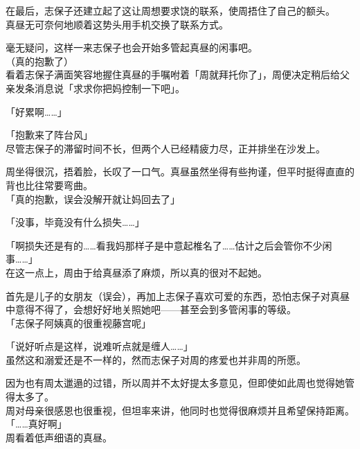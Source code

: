 在最后，志保子还建立起了这让周想要求饶的联系，使周捂住了自己的额头。\\

真昼无可奈何地顺着这势头用手机交换了联系方式。

毫无疑问，这样一来志保子也会开始多管起真昼的闲事吧。\\

（真的抱歉了）\\

看着志保子满面笑容地握住真昼的手嘱咐着「周就拜托你了」，周便决定稍后给父亲发条消息说「求求你把妈控制一下吧」。\\

\vspace{2\baselineskip}

「好累啊……」

「抱歉来了阵台风」\\

尽管志保子的滞留时间不长，但两个人已经精疲力尽，正并排坐在沙发上。

周坐得很沉，捂着脸，长叹了一口气。真昼虽然坐得有些拘谨，但平时挺得直直的背也比往常要弯曲。\\

「真的抱歉，误会没解开就让妈回去了」

「没事，毕竟没有什么损失……」

「啊损失还是有的……看我妈那样子是中意起椎名了……估计之后会管你不少闲事……」\\

在这一点上，周由于给真昼添了麻烦，所以真的很对不起她。

首先是儿子的女朋友（误会），再加上志保子喜欢可爱的东西，恐怕志保子对真昼中意得不得了，会想好好地关照她吧——甚至会到多管闲事的等级。\\

「志保子阿姨真的很重视藤宫呢」

「说好听点是这样，说难听点就是缠人……」\\

虽然这和溺爱还是不一样的，然而志保子对周的疼爱也并非周的所愿。

因为也有周太邋遢的过错，所以周并不太好提太多意见，但即使如此周也觉得她管得太多了。\\

周对母亲很感恩也很重视，但坦率来讲，他同时也觉得很麻烦并且希望保持距离。\\

「……真好啊」\\

周看着低声细语的真昼。\\

